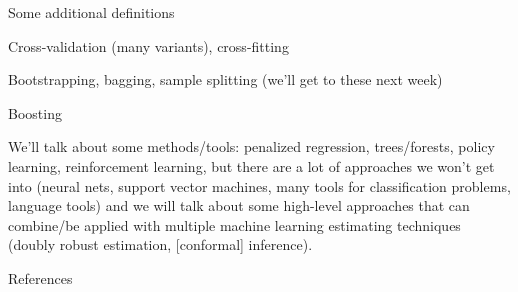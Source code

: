 \documentclass[xcolor={dvipsnames},handout]{beamer}
\begin{document}

\begin{frame}{Some additional definitions}

\begin{wideitemize}
\item Cross-validation (many variants), cross-fitting \pause
\item Bootstrapping, bagging, sample splitting \pause (we'll get to these next week)\pause
\item Boosting \pause
\item We'll talk about some methods/tools: penalized regression, trees/forests, policy learning, reinforcement learning\pause, but there are a lot of approaches we won't get into (neural nets, support vector machines, many tools for classification problems, language tools) \pause and we will talk about some high-level approaches that can combine/be applied with multiple machine learning estimating techniques (doubly robust estimation, [conformal] inference). 
\end{wideitemize}

\end{frame}



\backupbegin

\begin{frame}[allowframebreaks]{References}
    
    
\end{frame}
\backupend
\end{document}
